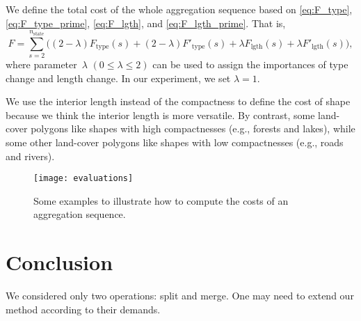 \documentclass[ijgi,article,submit,moreauthors,pdftex]{Definitions/mdpi}
\begin{document}
We define the total cost of the whole aggregation sequence
based on \eqs\ref{eq:F_type}, \ref{eq:F_type_prime}, 
\ref{eq:F_lgth}, and \ref{eq:F_lgth_prime}. 
That is,
\begin{equation}
\label{eq:F}
F = \sum_{s=2}^{n_\mathrm{state}}
        \bigg(
            (2-\lambda)F_\mathrm{type}(s) +
            (2-\lambda)F'_\mathrm{type}(s) + 
            \lambda F_\mathrm{lgth}(s) +
            \lambda F'_\mathrm{lgth}(s)
        \bigg),
\end{equation}
where parameter~$\lambda$ $(0\le \lambda \le 2)$ can be used to assign the importances of 
type change and length change.
In our experiment, we set $\lambda=1$.

We use the interior length instead of the compactness to define the cost of shape
because we think the interior length is more versatile.
By contrast, some land-cover polygons like shapes with high compactnesses 
(e.g., forests and lakes),
while some other land-cover polygons like shapes with low compactnesses 
(e.g., roads and rivers).


\begin{figure*}[tb]
\centering
\texttt{[image: evaluations]}
\caption{Some examples to illustrate how to compute the costs of an aggregation sequence.
}
\label{fig:evaluations}
\end{figure*}



\section{Conclusion}
We considered only two operations: split and merge.
One may need to extend our method according to their demands.
\end{document}
